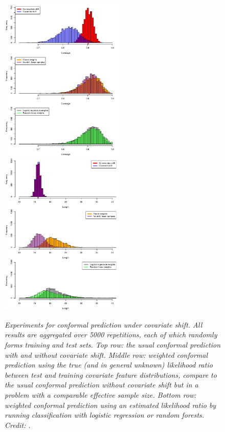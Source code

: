 \documentclass{article}
\begin{document}
\begin{figure}[htb]
\hspace{-25pt}
\includegraphics[width=0.525\textwidth]{airfoil_cov.pdf}
\includegraphics[width=0.525\textwidth]{airfoil_len.pdf}
\caption{\it Experiments for conformal prediction under covariate shift. All
  results are aggregated over 5000 repetitions, each of which randomly forms
  training and test sets. Top row: the usual conformal prediction with and
  without covariate shift. Middle row: weighted conformal prediction using the
  true (and in general unknown) likelihood ratio between test and training
  covariate feature distributions, compare to the usual conformal prediction
  without covariate shift but in a problem with a comparable effective sample 
  size. Bottom row: weighted conformal prediction using an estimated likelihood 
  ratio by running classification with logistic regression or random forests. 
  Credit: \citet{tibshirani2019conformal}.}      
\label{fig:airfoil}
\end{figure}
\end{document}
